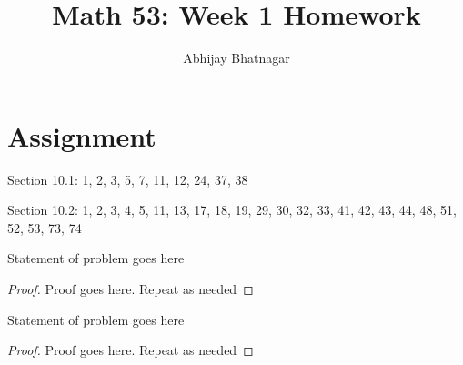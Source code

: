 \documentclass[12pt]{article}
\newenvironment{problem}[2][Problem]{\begin{trivlist}
\item[\hskip \labelsep {\bfseries #1}\hskip \labelsep {\bfseries #2.}]}{\end{trivlist}}
\begin{document}

\title{Math 53: Week 1 Homework}
\author{Abhijay Bhatnagar}
\maketitle

\setcounter{secnumdepth}{0} %
\section{Assignment}

Section 10.1: 1, 2, 3, 5, 7, 11, 12, 24, 37, 38

Section 10.2: 1, 2, 3, 4, 5, 11, 13, 17, 18, 19, 29, 30, 32, 33, 41, 42, 43, 44, 48, 51, 52, 53, 73, 74
\newline


\begin{problem}{10.1.1}
Statement of problem goes here
\end{problem}

\begin{proof}
Proof goes here. Repeat as needed
\end{proof}





\begin{problem}{x.yz}
Statement of problem goes here
\end{problem}

\begin{proof}
Proof goes here. Repeat as needed
\end{proof}
\end{document}

